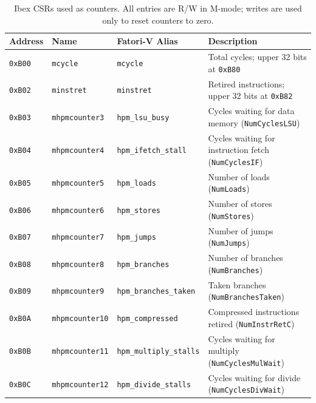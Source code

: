 \begin{table}[h]
\centering
\begin{tabularx}{\textwidth}{|l|l|l|X|}
\hline
\rowcolor{tableheader}\textbf{Address} & \textbf{Name} & \textbf{\ac{Fatori-V} Alias} & \textbf{Description}\\
\hline
\hline
\texttt{0xB00} & \texttt{mcycle} & \texttt{mcycle} & Total cycles; upper 32 bits at \texttt{0xB80}\\
\hline
\texttt{0xB02} & \texttt{minstret} & \texttt{minstret} & Retired instructions; upper 32 bits at \texttt{0xB82}\\
\hline
\texttt{0xB03} & \texttt{mhpmcounter3} & \texttt{hpm\_lsu\_busy} & Cycles waiting for data memory (\texttt{NumCyclesLSU})\\
\hline
\texttt{0xB04} & \texttt{mhpmcounter4} & \texttt{hpm\_ifetch\_stall} & Cycles waiting for instruction fetch (\texttt{NumCyclesIF})\\
\hline
\texttt{0xB05} & \texttt{mhpmcounter5} & \texttt{hpm\_loads} & Number of loads (\texttt{NumLoads})\\
\hline
\texttt{0xB06} & \texttt{mhpmcounter6} & \texttt{hpm\_stores} & Number of stores (\texttt{NumStores})\\
\hline
\texttt{0xB07} & \texttt{mhpmcounter7} & \texttt{hpm\_jumps} & Number of jumps (\texttt{NumJumps})\\
\hline
\texttt{0xB08} & \texttt{mhpmcounter8} & \texttt{hpm\_branches} & Number of branches (\texttt{NumBranches})\\
\hline
\texttt{0xB09} & \texttt{mhpmcounter9} & \texttt{hpm\_branches\_taken} & Taken branches (\texttt{NumBranchesTaken})\\
\hline
\texttt{0xB0A} & \texttt{mhpmcounter10} & \texttt{hpm\_compressed} & Compressed instructions retired (\texttt{NumInstrRetC})\\
\hline
\texttt{0xB0B} & \texttt{mhpmcounter11} & \texttt{hpm\_multiply\_stalls} & Cycles waiting for multiply (\texttt{NumCyclesMulWait})\\
\hline
\texttt{0xB0C} & \texttt{mhpmcounter12} & \texttt{hpm\_divide\_stalls} & Cycles waiting for divide (\texttt{NumCyclesDivWait})\\
\hline
\end{tabularx}
\caption{Ibex \acp{CSR} used as counters. All entries are R/W in M-mode; writes are used only to reset counters to zero.}
\label{tab:ibex_perf_csrs_example}
\end{table}





